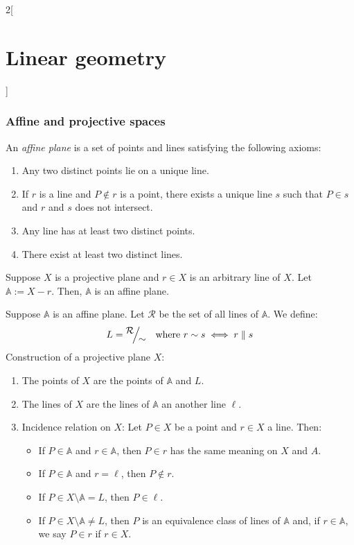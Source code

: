 \documentclass[../../../main.tex]{subfiles}
\begin{document}
\begin{multicols}{2}[\section{Linear geometry}]
  \subsubsection{Affine and projective spaces}
  \begin{definition}
    An \emph{affine plane} is a set of points and lines satisfying the following axioms:
    \begin{enumerate}
      \item Any two distinct points lie on a unique line.
      \item If $r$ is a line and $P\notin r$ is a point, there exists a unique line $s$ such that $P\in s$ and $r$ and $s$ does not intersect.
      \item Any line has at least two distinct points.
      \item There exist at least two distinct lines.
    \end{enumerate}
  \end{definition}
  \begin{proposition}
    Suppose $X$ is a projective plane and $r\in X$ is an arbitrary line of $X$. Let $\mathbb{A}:=X-r.$ Then, $\mathbb{A}$ is an affine plane.
  \end{proposition}
  \begin{proposition}
    Suppose $\mathbb{A}$ is an affine plane. Let $\mathcal{R}$ be the set of all lines of $\mathbb{A}$. We define: $$L=\quot{\mathcal{R}}{\sim}\quad\text{where }r\sim s\iff r \parallel s$$ Construction of a projective plane $X$:
    \begin{enumerate}
      \item The points of $X$ are the points of $\mathbb{A}$ and $L$.
      \item The lines of $X$ are the lines of $\mathbb{A}$ an another line $\ell$.
      \item Incidence relation on $X$: Let $P\in X$ be a point and $r\in X$ a line. Then:
            \begin{itemize}
              \item If $P\in\mathbb{A}$ and $r\in\mathbb{A}$, then $P\in r$ has the same meaning on $X$ and $A$.
              \item If $P\in\mathbb{A}$ and $r=\ell$, then $P\notin r$.
              \item If $P\in X\setminus\mathbb{A}=L$, then $P\in\ell$.
              \item If $P\in X\setminus\mathbb{A}\ne L$, then $P$ is an equivalence class of lines of $\mathbb{A}$ and, if $r\in\mathbb{A}$, we say $P\in r$ if $r\in X$.
            \end{itemize}
    \end{enumerate}
  \end{proposition}

\end{multicols}
\end{document}

